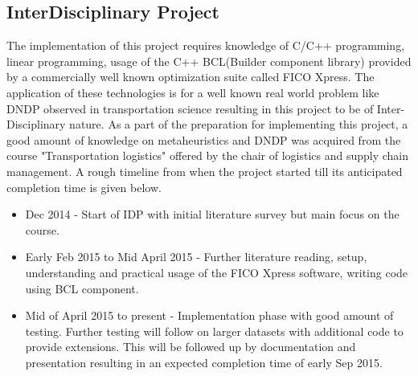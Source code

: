 \documentclass{article}
\begin{document}
\subsection{InterDisciplinary Project}
The implementation of this project requires knowledge of C/C++ programming, linear programming, usage of the C++ BCL(Builder component library) provided by a commercially well known optimization suite called FICO Xpress. The application of these technologies is for a well known real world problem like DNDP observed in transportation science resulting in this project to be of Inter-Disciplinary nature. As a part of the preparation for implementing this project, a good amount of knowledge on metaheuristics and DNDP was acquired from the course "Transportation logistics" offered by the chair of logistics and supply chain management. A rough timeline from when the project started till its anticipated completion time is given below.
\begin{itemize}
\item Dec 2014 - Start of IDP with initial literature survey but main focus on the course.
\item Early Feb 2015 to Mid April 2015 - Further literature reading, setup, understanding and practical usage of the FICO Xpress software, writing code using BCL component.
\item Mid of April 2015 to present - Implementation phase with good amount of testing. Further testing will follow on larger datasets with additional code to provide extensions. This will be followed up by documentation and presentation resulting in an expected completion time of early Sep 2015.
\end{itemize}

\end{document}
